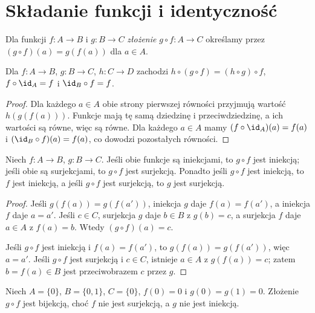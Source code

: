 \section{Składanie funkcji i identyczność}
\begin{definicja}[Złożenie]\label{def:composition}
Dla funkcji $f:A\to B$ i $g:B\to C$ \emph{złożenie} $g\circ f:A\to C$ określamy przez $(g\circ f)(a)=g(f(a))$ dla $a\in A$.
\end{definicja}
\begin{twierdzenie}\label{thm:composition-laws}
Dla $f:A\to B$, $g:B\to C$, $h:C\to D$ zachodzi $h\circ(g\circ f)=(h\circ g)\circ f$, $f\circ\id_A=f$ i $\id_B\circ f=f$.
\end{twierdzenie}
\begin{proof}
Dla każdego $a\in A$ obie strony pierwszej równości przyjmują wartość $h(g(f(a)))$. Funkcje mają tę samą dziedzinę i przeciwdziedzinę, a ich wartości są równe, więc są równe. Dla każdego $a\in A$ mamy $(f\circ\id_A)(a)=f(a)$ i $(\id_B\circ f)(a)=f(a)$, co dowodzi pozostałych równości.
\end{proof}
\begin{twierdzenie}\label{thm:composition-inj-surj}
Niech $f:A\to B$, $g:B\to C$. Jeśli obie funkcje są iniekcjami, to $g\circ f$ jest iniekcją; jeśli obie są surjekcjami, to $g\circ f$ jest surjekcją. Ponadto jeśli $g\circ f$ jest iniekcją, to $f$ jest iniekcją, a jeśli $g\circ f$ jest surjekcją, to $g$ jest surjekcją.
\end{twierdzenie}
\begin{proof}
Jeśli $g(f(a))=g(f(a'))$, iniekcja $g$ daje $f(a)=f(a')$, a iniekcja $f$ daje $a=a'$. Jeśli $c\in C$, surjekcja $g$ daje $b\in B$ z $g(b)=c$, a surjekcja $f$ daje $a\in A$ z $f(a)=b$. Wtedy $(g\circ f)(a)=c$.

Jeśli $g\circ f$ jest iniekcją i $f(a)=f(a')$, to $g(f(a))=g(f(a'))$, więc $a=a'$. Jeśli $g\circ f$ jest surjekcją i $c\in C$, istnieje $a\in A$ z $g(f(a))=c$; zatem $b=f(a)\in B$ jest przeciwobrazem $c$ przez $g$.
\end{proof}
\begin{przyklad}
Niech $A=\{0\}$, $B=\{0,1\}$, $C=\{0\}$, $f(0)=0$ i $g(0)=g(1)=0$. Złożenie $g\circ f$ jest bijekcją, choć $f$ nie jest surjekcją, a $g$ nie jest iniekcją.
\end{przyklad}

